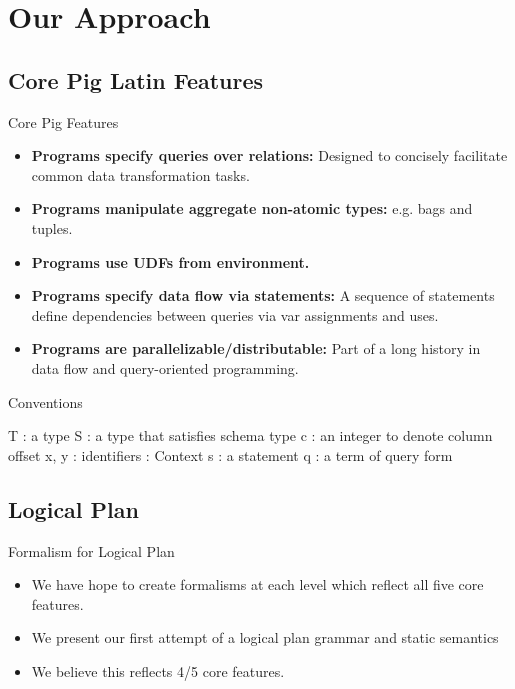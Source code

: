 \section{Our Approach}

\subsection{Core Pig Latin Features}
\begin{frame}{Core Pig Features}
\begin{itemize}
	\item \textbf{Programs specify queries over relations:} Designed to
	concisely facilitate common data transformation tasks.
	\item \textbf{Programs manipulate aggregate non-atomic types:} e.g. bags
	and tuples.
	\item \textbf{Programs use UDFs from environment.}
	\item \textbf{Programs specify data flow via statements:} A sequence of
	statements define dependencies between queries via var assignments and uses.
	\item \textbf{Programs are parallelizable/distributable:} Part of a long
	history in data flow and query-oriented programming.
\end{itemize}
\end{frame}

\begin{frame}{Conventions}
\centering
	\begin{flushleft}
		T : a type\newline
		S : a type that satisfies schema type\newline
		c : an integer to denote column offset\newline
		x, y : identifiers\newline
		\textGamma \: : Context\newline
 		s : a statement\newline
 		q : a term of query form\newline 
	\end{flushleft}
\end{frame}

\subsection{Logical Plan}
\begin{frame}{Formalism for Logical Plan}
\begin{itemize}
	\item We have hope to create formalisms at each level which reflect all five
	core features.
	\item We present our first attempt of a logical plan grammar and static
	semantics
	\item We believe this reflects 4/5 core features.
\end{itemize}
\end{frame}

